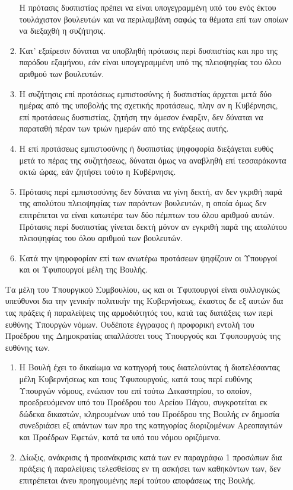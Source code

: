 \documentclass[twoside, a4paper, 10pt]{article}
\begin{document}
\begin{multicols}{2}
\begin{enumerate}
\begin{BigQuote}
\begin{enumerate}
	Η πρότασις δυσπιστίας πρέπει να είναι υπογεγραμμένη υπό του ενός έκτου τουλάχιστον βουλευτών και να περιλαμβάνη σαφώς τα θέματα επί των οποίων να διεξαχθή η συζήτησις.
  \item[3.] Κατ' εξαίρεσιν δύναται να υποβληθή πρότασις περί δυσπιστίας και προ της παρόδου εξαμήνου, εάν είναι υπογεγραμμένη υπό της πλειοψηφίας του όλου αριθμού των βουλευτών.
  \item[4.] Η συζήτησις επί προτάσεως εμπιστοσύνης ή δυσπιστίας άρχεται μετά δύο ημέρας από της υποβολής της σχετικής προτάσεως, πλην αν η Κυβέρνησις, επί προτάσεως δυσπιστίας, ζητήση την άμεσον έναρξιν, δεν δύναται να παραταθή πέραν των τριών ημερών από της ενάρξεως αυτής.
  \item[5.] Η επί προτάσεως εμπιστοσύνης ή δυσπιστίας ψηφοφορία διεξάγεται ευθύς μετά το πέρας της συζητήσεως, δύναται όμως να αναβληθή επί τεσσαράκοντα οκτώ ώρας, εάν ζητήσει τούτο η Κυβέρνησις.
  \item[6.] Πρότασις περί εμπιστοσύνης δεν δύναται να γίνη δεκτή, αν δεν γκριθή παρά της απολύτου πλειοψηφίας των παρόντων βουλευτών, η οποία όμως δεν επιτρέπεται να είναι κατωτέρα των δύο πέμπτων του όλου αριθμού αυτών. Πρότασις περί δυσπιστίας γίνεται δεκτή μόνον αν εγκριθή  παρά της απολύτου πλειοψηφίας του όλου αριθμού των βουλευτών.
  \item[7.] Κατά την ψηφοφορίαν επί των ανωτέρω προτάσεων ψηφίζουν οι Υπουργοί και οι Υφυπουργοί μέλη της Βουλής.
\end{enumerate}

Τα μέλη του Υπουργικού Συμβουλίου, ως και οι Υφυπουργοί είναι συλλογικώς υπεύθυνοι δια την γενικήν πολιτικήν της Κυβερνήσεως, έκαστος δε εξ αυτών δια τας πράξεις ή παραλείψεις της αρμοδιότητός του, κατά τας διατάξεις των περί ευθύνης Υπουργών νόμων. Ουδέποτε έγγραφος ή προφορική εντολή του Προέδρου της Δημοκρατίας απαλλάσσει τους Υπουργούς και Υφυπουργούς της ευθύνης των.

\begin{enumerate}
  \item[1.] Η Βουλή έχει το δικαίωμα να κατηγορή τους διατελούντας ή διατελέσαντας μέλη Κυβερνήσεως και τους Υφυπουργούς, κατά τους περί ευθύνης Υπουργών νόμους, ενώπιον του επί τούτω Δικαστηρίου, το οποίον, προεδρευόμενον υπό του Προέδρου του Αρείου Πάγου, συγκροτείται εκ δώδεκα δικαστών, κληρουμένων υπό του Προέδρου της Βουλής εν δημοσία συνεδριάσει εξ απάντων των προ της κατηγορίας διοριζομένων Αρεοπαγιτών και Προέδρων Εφετών, κατά τα υπό του νόμου οριζόμενα.
  \item[2.] Δίωξις, ανάκρισις ή προανάκρισις κατά των εν παραγράφω 1 προσώπων δια πράξεις ή παραλείψεις τελεσθείσας εν τη ασκήσει των  καθηκόντων των, δεν επιτρέπεται άνευ προηγουμένης περί τούτου αποφάσεως της Βουλής.


\end{enumerate}
\end{BigQuote}
\end{enumerate}
\end{multicols}
\end{document}
